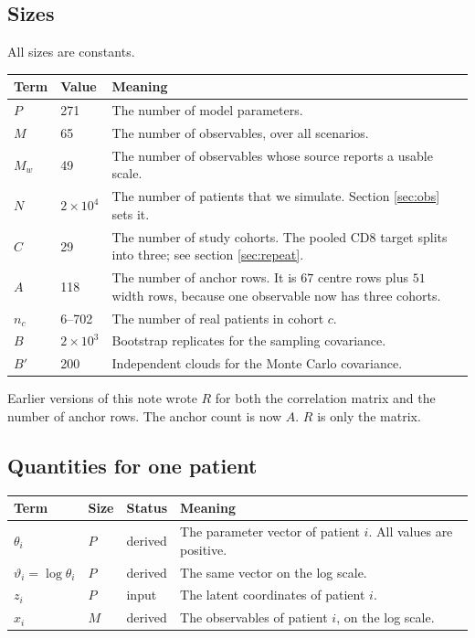 \documentclass[11pt]{article}
\newcommand{\FIX}{\textcolor{softgray}{input}}
\newcommand{\DER}{\textcolor{softgray}{derived}}
\begin{document}
\subsection*{Sizes}
All sizes are constants.
\begin{center}\small
\begin{tabularx}{\textwidth}{@{}llX@{}}
\toprule
Term & Value & Meaning \\
\midrule
$P$ & 271 & The number of model parameters. \\
$M$ & 65 & The number of observables, over all scenarios. \\
$M_w$ & 49 & The number of observables whose source reports a usable scale. \\
$N$ & $2\times10^4$ & The number of patients that we simulate. Section \ref{sec:obs} sets it. \\
$C$ & 29 & The number of study cohorts. The pooled CD8 target splits into three; see section \ref{sec:repeat}. \\
$A$ & 118 & The number of anchor rows. It is $67$ centre rows plus $51$ width rows, because one observable now has three cohorts. \\
$n_c$ & 6--702 & The number of real patients in cohort $c$. \\
$B$ & $2\times10^3$ & Bootstrap replicates for the sampling covariance. \\
$B'$ & 200 & Independent clouds for the Monte Carlo covariance. \\
\bottomrule
\end{tabularx}
\end{center}

\noindent
Earlier versions of this note wrote $R$ for both the correlation matrix and the
number of anchor rows. The anchor count is now $A$. $R$ is only the matrix.

\subsection*{Quantities for one patient}
\begin{center}\small
\begin{tabularx}{\textwidth}{@{}lllX@{}}
\toprule
Term & Size & Status & Meaning \\
\midrule
$\theta_i$ & $P$ & \DER & The parameter vector of patient $i$. All values are positive. \\
$\vartheta_i=\log\theta_i$ & $P$ & \DER & The same vector on the log scale. \\
$z_i$ & $P$ & \FIX & The latent coordinates of patient $i$. \\
$x_i$ & $M$ & \DER & The observables of patient $i$, on the log scale. \\
\bottomrule
\end{tabularx}
\end{center}
\end{document}

